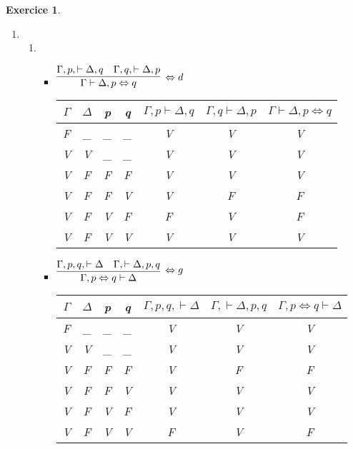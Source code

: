 \documentclass{article}
\theoremstyle{plain}
\newtheorem{exo}{Exercice}%
\begin{document}
\begin{exo}
\begin{enumerate}
    \item \begin{enumerate}
        \item \begin{itemize}
            \item $\infer[\Leftrightarrow d]{\Gamma \vdash \Delta, p \Leftrightarrow q}
                    {\Gamma, p, \vdash \Delta, q & \Gamma, q, \vdash \Delta, p}$

            \begin{tabular}{c | c | c | c | c | c | c}
                $\Gamma$ & $\Delta$ & p & q & $\Gamma, p \vdash \Delta, q$
                    & $\Gamma, q \vdash \Delta, p$ & $\Gamma \vdash \Delta, p \Leftrightarrow q$ \\
                \hline
                F & \_ & \_ & \_ & V & V & V \\
                V & V  & \_ & \_ & V & V & V \\
                V & F  & F  & F  & V & V & V \\
                V & F  & F  & V  & V & F & F \\
                V & F  & V  & F  & F & V & F \\
                V & F  & V  & V  & V & V & V \\
            \end{tabular}
            \vspace*{1cm}
            \item $\infer[\Leftrightarrow g]{\Gamma, p \Leftrightarrow q \vdash \Delta}
            {\Gamma, p, q, \vdash \Delta & \Gamma, \vdash \Delta, p, q}$

            \begin{tabular}{c | c | c | c | c | c | c}
                $\Gamma$ & $\Delta$ & p & q & $\Gamma, p, q, \vdash \Delta$
                    & $\Gamma, \vdash \Delta, p, q$ & $\Gamma, p \Leftrightarrow q \vdash \Delta$ \\
                \hline
                F & \_ & \_ & \_ & V & V & V \\
                V & V  & \_ & \_ & V & V & V \\
                V & F  & F  & F  & V & F & F \\
                V & F  & F  & V  & V & V & V \\
                V & F  & V  & F  & V & V & V \\
                V & F  & V  & V  & F & V & F \\
            \end{tabular}


\end{itemize}
\end{enumerate}
\end{enumerate}
\end{exo}
\end{document}
